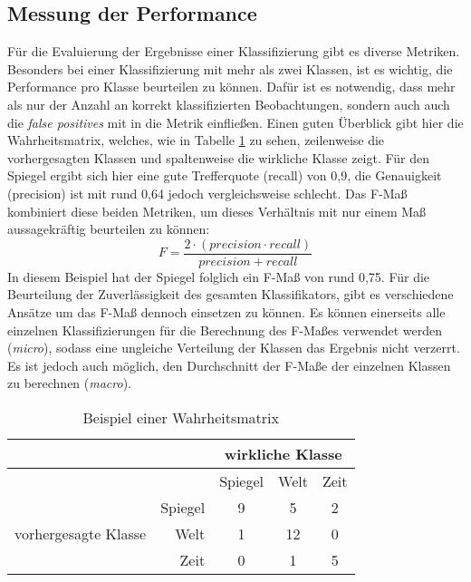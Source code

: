 \subsection{Messung der Performance}
Für die Evaluierung der Ergebnisse einer Klassifizierung gibt es diverse Metriken. Besonders bei einer Klassifizierung mit mehr als zwei Klassen, ist es wichtig, die Performance pro Klasse beurteilen zu können. Dafür ist es notwendig, dass mehr als nur der Anzahl an korrekt klassifizierten Beobachtungen, sondern auch auch die \textit{false positives} mit in die Metrik einfließen. Einen guten Überblick gibt hier die Wahrheitsmatrix, welches, wie in Tabelle \ref{confusion_matrix} zu sehen, zeilenweise die vorhergesagten Klassen und spaltenweise die wirkliche Klasse zeigt. Für den Spiegel ergibt sich hier eine gute Trefferquote (recall) von 0,9, die Genauigkeit (precision) ist mit rund 0,64 jedoch vergleichsweise schlecht. Das F-Maß kombiniert diese beiden Metriken, um dieses Verhältnis mit nur einem Maß aussagekräftig beurteilen zu können:
\[ F = \frac{2 \cdot (precision \cdot recall)}{precision + recall} \]
In diesem Beispiel hat der Spiegel folglich ein F-Maß von rund 0,75. Für die Beurteilung der Zuverlässigkeit des gesamten Klassifikators, gibt es verschiedene Ansätze um das F-Maß dennoch einsetzen zu können. Es können einerseits alle einzelnen Klassifizierungen für die Berechnung des F-Maßes verwendet werden (\textit{micro}), sodass eine ungleiche Verteilung der Klassen das Ergebnis nicht verzerrt. Es ist jedoch auch möglich, den Durchschnitt der F-Maße der einzelnen Klassen zu berechnen (\textit{macro}).

\begin{table}
\centering
\begin{spacing}{1.25}
\begin{tabular}[t]{lrccc}
\toprule
~ & ~ & \multicolumn{3}{c}{wirkliche Klasse}\\
\midrule
~ & ~ & Spiegel & Welt & Zeit\\
\multirow{3}{*}{vorhergesagte Klasse} & Spiegel & 9 & 5 & 2\\
& Welt & 1 & 12 & 0\\
& Zeit & 0 & 1 & 5\\
\bottomrule
\end{tabular}
\caption{Beispiel einer Wahrheitsmatrix}
\label{confusion_matrix}
\end{spacing}
\end{table}

